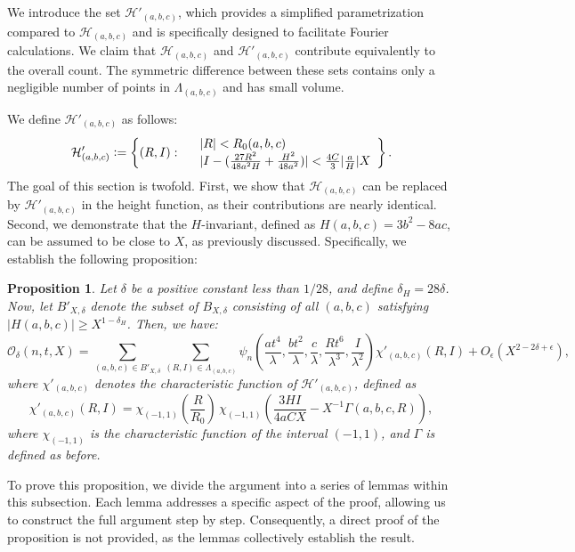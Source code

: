 \documentclass{article}
\def\H{{\mathcal H}}
\def\H{{\mathcal H}}
\newtheorem{proposition}[theorem]{Proposition}
\def \Bodi{{\mathcal{O}}_{\delta}(n,t,X)}
\def\JR{\frac{27R^2}{48a^2H}+\frac{H^2}{48a^2}}
\begin{document}
We introduce the set $\mathcal{H}'_{(a, b, c)}$, which provides a simplified parametrization compared to $\mathcal{H}_{(a, b, c)}$ and is specifically designed to facilitate Fourier calculations. We claim that $\mathcal{H}_{(a, b, c)}$ and $\mathcal{H}'_{(a, b, c)}$ contribute equivalently to the overall count. The symmetric difference between these sets contains only a negligible number of points in $\Lambda_{(a, b, c)}$ and has small volume.  

We define $\mathcal{H}'_{(a, b, c)}$ as follows:
\begin{equation}\label{HH_def} \H'_{(a,b,c)} \vcentcolon= \left\{(R,I) : \begin{array}{ll} & |R| < R_0(a,b,c) \\ & |I - (\JR)| < \frac{4C}{3}|\frac{a}{H}|X \end{array} \right\}. \end{equation}
The goal of this section is twofold. First, we show that $\mathcal{H}_{(a, b, c)}$ can be replaced by $\mathcal{H}'_{(a, b, c)}$ in the height function, as their contributions are nearly identical. Second, we demonstrate that the $H$-invariant, defined as $H(a, b, c) = 3b^2 - 8ac$, can be assumed to be close to $X$, as previously discussed. Specifically, we establish the following proposition:


\begin{proposition}\label{height_and_H_change_proposition}
Let $\delta$ be a positive constant less than $1/28$, and define $\delta_H = 28\delta$. Now, let $B'_{X,\delta}$ denote the subset of $B_{X, \delta}$ consisting of all $(a, b, c)$ satisfying $|H(a, b, c)| \geq X^{1 - \delta_H}$. Then, we have:
\begin{equation*}
\Bodi = \sum_{(a, b, c) \in B'_{X, \delta}} \sum_{(R, I) \in \Lambda_{(a, b, c)}} \psi_{n} \left( \frac{a t^4}{\lambda}, \frac{b t^2}{\lambda}, \frac{c}{\lambda}, \frac{R t^6}{\lambda^3}, \frac{I}{\lambda^2} \right) \chi'_{(a, b, c)}(R, I) + O_{\epsilon}(X^{2 - 2\delta + \epsilon}),
\end{equation*}
where $\chi'_{(a, b, c)}$ denotes the characteristic function of $\H'_{(a, b, c)}$, defined as
\begin{equation*}
   \chi'_{(a, b, c)}(R, I) = \chi_{(-1,1)}\left(\frac{R}{R_0}\right)\,\chi_{(-1,1)}\left(\frac{3HI}{4aCX} - X^{-1} \Gamma(a, b, c, R) \right),
\end{equation*}
where $\chi_{(-1,1)}$ is the characteristic function of the interval $(-1,1)$, and $\Gamma$ is defined as before.
\end{proposition}
To prove this proposition, we divide the argument into a series of lemmas within this subsection. Each lemma addresses a specific aspect of the proof, allowing us to construct the full argument step by step. Consequently, a direct proof of the proposition is not provided, as the lemmas collectively establish the result.
\end{document}
